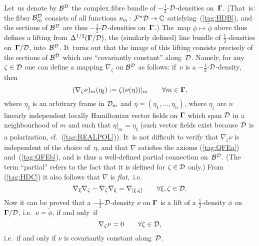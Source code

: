 \documentclass[11pt]{amsart}
\numberwithin{equation}{section}
\theoremstyle{remark}
\newcommand\Omg{{\bigam}}   %
\newcommand\FF{\Cal F}
\newcommand\DD{{\Cal D}}
\newcommand\MD{{\Omg/\DD}}
\newcommand\mhD{$-\tfrac12$-$\DD$}
\newcommand\BB{\Cal B}
\newcommand{\CC}{\C}
\newcommand{\bigam}{\mbox{\boldmath $\Gamma$}}
\newcommand{\C}{\mathbb C}
\begin{document}
Let~us denote by $\BB^\DD$ the complex fibre bundle of \mhD-densities
on~$\Omg$. (That~is: the fiber $\BB_m^\DD$ consists of all functions
$\nu_m:\FF^n\DD\to\CC$ satisfying~(\ref{tag:HDB}), and the sections of
$\BB^\DD$ are thus \mhD-densities on~$\Omg$.) The~map $\phi\mapsto\tilde\phi$
above thus defines a lifting from $\Delta^{1/2}(\MD)$, the (similarly defined)
line bundle of $\tfrac12$-densities on~$\MD$, into~$\BB^\DD$. It~turns out that
the image of this lifting consists precisely of the sections of $\BB^\DD$ which
are ``covariantly constant'' along~$\DD$. Namely, for any $\zeta\in\DD$ one can
define a mapping $\nabla_\zeta$ on $\BB^\DD$ as follows: if~$\nu$ is a
\mhD-density, then
\begin{equation}  (\nabla_\zeta \nu)_m (\eta_\sharp) := \zeta(\nu(\eta))|_m
\qquad \forall m\in \Omg,   \label{tag:HDC}  \end{equation}
where $\eta_\sharp$ is an arbitrary frame in $\DD_m$ and
$\eta=(\eta_1,\dots,\eta_n)$, where $\eta_j$ are $n$ linearly independent
locally Hamiltonian vector fields on $\Omg$ which span $\DD$ in a neighbourhood
of $m$ and such that $\eta|_m=\eta_\sharp$ (such vector fields exist because
$\DD$ is a polarization, cf.~(\ref{tag:REALPOL})). It~is not difficult to
verify that $\nabla_\zeta\nu$ is independent of the choice of~$\eta$, and that
$\nabla$ satisfies the axioms (\ref{tag:QFEa}) and~(\ref{tag:QFEb}), and is
thus a well-defined partial connection on~$\BB^\DD$. (The term ``partial''
refers to the fact that it is defined for $\zeta\in\DD$ only.)
From (\ref{tag:HDC}) it also follows that $\nabla$ is {\sl flat,\/}~i.e.
$$ \nabla_\xi\nabla_\zeta-\nabla_\zeta\nabla_\xi=\nabla_{[\xi,\zeta]}
\qquad \forall \xi,\zeta\in\DD.  $$
Now it can be proved that a \mhD-density $\nu$ on $\Omg$ is a lift of a
$\frac12$-density $\phi$ on $\MD$, i.e.~$\nu=\tilde\phi$, if and only~if
$$ \nabla_\zeta\nu =0 \qquad\forall \zeta\in\DD,  $$
i.e.~if and only if $\nu$ is covariantly constant along~$\DD$.
\end{document}
